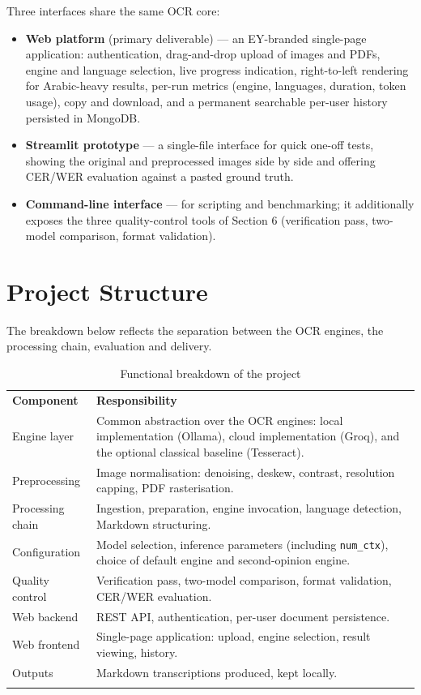 \documentclass[11pt,a4paper]{article}
\newcommand{\toprule}{\noalign{\hrule height 0.9pt}\noalign{\vskip 3pt}}
\newcommand{\midrule}{\noalign{\vskip 3pt}\noalign{\hrule height 0.4pt}\noalign{\vskip 3pt}}
\newcommand{\bottomrule}{\noalign{\vskip 3pt}\noalign{\hrule height 0.9pt}}
\begin{document}
Three interfaces share the same OCR core:

\begin{itemize}
  \item \textbf{Web platform} (primary deliverable) --- an EY-branded
        single-page application: authentication, drag-and-drop upload of images
        and PDFs, engine and language selection, live progress indication,
        right-to-left rendering for Arabic-heavy results, per-run metrics
        (engine, languages, duration, token usage), copy and download, and a
        permanent searchable per-user history persisted in MongoDB.
  \item \textbf{Streamlit prototype} --- a single-file interface for quick
        one-off tests, showing the original and preprocessed images side by
        side and offering CER/WER evaluation against a pasted ground truth.
  \item \textbf{Command-line interface} --- for scripting and benchmarking; it
        additionally exposes the three quality-control tools of Section 6
        (verification pass, two-model comparison, format validation).
\end{itemize}

\section{Project Structure}

The breakdown below reflects the separation between the OCR engines, the
processing chain, evaluation and delivery.

\begin{table}[H]
\centering
\begin{tabular}{@{}L{3.4cm}L{10.6cm}@{}}
\toprule
\textbf{Component} & \textbf{Responsibility} \\
\midrule
Engine layer & Common abstraction over the OCR engines: local implementation
  (Ollama), cloud implementation (Groq), and the optional classical baseline
  (Tesseract). \\
Preprocessing & Image normalisation: denoising, deskew, contrast, resolution
  capping, PDF rasterisation. \\
Processing chain & Ingestion, preparation, engine invocation, language
  detection, Markdown structuring. \\
Configuration & Model selection, inference parameters (including
  \texttt{num\_ctx}), choice of default engine and second-opinion engine. \\
Quality control & Verification pass, two-model comparison, format validation,
  CER/WER evaluation. \\
Web backend & REST API, authentication, per-user document persistence. \\
Web frontend & Single-page application: upload, engine selection, result
  viewing, history. \\
Outputs & Markdown transcriptions produced, kept locally. \\
\bottomrule
\end{tabular}
\caption{Functional breakdown of the project}
\end{table}
\end{document}

